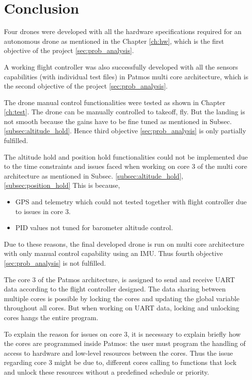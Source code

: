 \chapter{Conclusion}\label{ch:concl}
Four drones were developed with all the hardware specifications  required for an autonomous drone as mentioned in the Chapter \ref{ch:hw}, which is the first objective of the project \ref{sec:prob_analysis}. 

A working flight controller was also successfully developed with all the sensors capabilities (with individual test files) in Patmos multi core architecture, which is the second objective of the project \ref{sec:prob_analysis}. 

The drone manual control functionalities were tested as shown in Chapter \ref{ch:test}. The drone can be manually controlled to takeoff, fly. But the landing is not smooth because the gains have to  be fine tuned as mentioned in Subsec. \ref{subsec:altitude_hold}. Hence third objective \ref{sec:prob_analysis} is only partially fulfilled.

The altitude hold and position hold functionalities could not be implemented due to the time constraints and issues faced when working on core 3 of the multi core architecture as mentioned in Subsec.  \ref{subsec:altitude_hold}, \ref{subsec:position_hold} This is because, 
\begin{itemize}
    \item GPS and telemetry which could not tested together with flight controller due to issues in core 3. 
    \item PID values not tuned for barometer altitude control.
\end{itemize}
Due to these reasons, the final developed drone is run on multi core architecture with only manual control capability using an IMU. Thus fourth objective \ref{sec:prob_analysis} is not fulfilled.


The core 3 of the Patmos architecture, is assigned to send and receive UART data according to the flight controller designed. The data sharing between multiple cores is possible by locking the cores and updating the global variable throughout all cores. But when working on UART data, locking and unlocking cores hangs the entire program.

To explain the reason for issues on core 3, it is necessary to explain briefly how the cores are programmed inside Patmos: the user must  program the handling of access to hardware and low-level resources between the cores. Thus the issue regarding core 3 might be due to, different cores calling to functions that lock and unlock these resources without a predefined schedule or priority.

